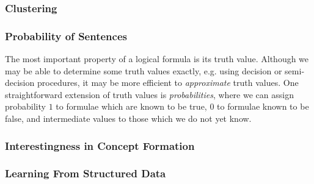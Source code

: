 \subsubsection{Clustering}
\label{sec:clustering}

\cite{journals/corr/abs-1212-3618}
\cite{heras2013proof}

\subsubsection{Probability of Sentences}

The most important property of a logical formula is its truth value. Although we
may be able to determine some truth values exactly, e.g. using decision or
semi-decision procedures, it may be more efficient to \emph{approximate} truth
values. One straightforward extension of truth values is \emph{probabilities},
where we can assign probability $1$ to formulae which are known to be true, $0$
to formulae known to be false, and intermediate values to those which we do not
yet know.

\cite{Hutter.Lloyd.Ng.ea:2013}

\subsubsection{Interestingness in Concept Formation}
\label{sec:conceptformation}

\cite{Montano-Rivas.McCasland.Dixon.ea:2012}
\cite{Piantadosi.Tenenbaum.Goodman:2012}
\cite{Wille:2005}
\cite{colton1999automatic}
\cite{colton2000agent}
\cite{colton2012automated}
\cite{lenat1977automated}
\cite{mullerunderstanding}
\cite{Bundy.Cavallo.Dixon.ea:2015}
\cite{johansson2009isacosy}
\cite{spector2008genetic}
\cite{colton2012automated}
 \cite{geng2006interestingness}




\subsubsection{Learning From Structured Data}

